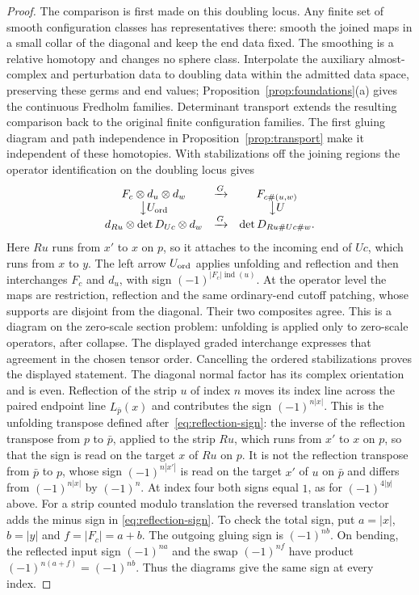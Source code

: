 \documentclass[11pt]{amsart}
\theoremstyle{definition}
\theoremstyle{remark}
\theoremstyle{plain}
\numberwithin{equation}{section}
\newcommand{\ind}{\operatorname{ind}}
\begin{document}
\begin{proof}
The comparison is first made on this doubling locus. Any finite
set of smooth configuration classes has representatives there:
smooth the joined maps in a small collar of the diagonal and keep
the end data fixed. The smoothing is a relative homotopy and
changes no sphere class. Interpolate the auxiliary almost-complex
and perturbation data to doubling data within the admitted data
space, preserving these germs and end values;
Proposition~\ref{prop:foundations}(a) gives the continuous
Fredholm families. Determinant transport extends the resulting
comparison back to the original finite configuration families.
The first gluing diagram and path independence in
Proposition~\ref{prop:transport} make it independent of these
homotopies. With stabilizations off the joining regions the
operator identification on the doubling locus gives
\[
\begin{array}{ccc}
 F_c\otimes d_u\otimes d_w&\xrightarrow{G}&F_{c\#(u,w)}\\
 \big\downarrow U_{\rm ord}&&\big\downarrow U\\
 d_{Ru}\otimes\det D_{Uc}\otimes d_w
 &\xrightarrow{G}&\det D_{Ru\#Uc\#w}.
\end{array}
\]
Here $Ru$ runs from $x'$ to $x$ on $p$, so it attaches to the
incoming end of $Uc$, which runs from $x$ to $y$. The left arrow
$U_{\rm ord}$ applies unfolding and reflection and then interchanges
$F_c$ and $d_u$, with sign $(-1)^{|F_c|\ind(u)}$. At the
operator level the maps are restriction, reflection and the same
ordinary-end cutoff patching, whose supports are disjoint from
the diagonal. Their two composites agree. This is a diagram on
the zero-scale section problem: unfolding is applied only to
zero-scale operators, after collapse. The
displayed graded interchange expresses that agreement in the
chosen tensor order. Cancelling the ordered
stabilizations proves the displayed statement. The diagonal
normal factor has its complex orientation and is even.
Reflection of the strip $u$ of index $n$ moves its index line
across the paired endpoint line $L_{\bar p}(x)$ and contributes the sign
$(-1)^{n|x|}$. This is the unfolding transpose defined
after~\eqref{eq:reflection-sign}: the inverse of the reflection transpose
from $p$ to $\bar p$, applied to the strip $Ru$, which runs from $x'$ to
$x$ on $p$, so that the sign is read on the target $x$ of $Ru$ on $p$. It
is not the reflection transpose from $\bar p$ to $p$, whose sign
$(-1)^{n|x'|}$ is read on the target $x'$ of $u$ on $\bar p$ and differs
from $(-1)^{n|x|}$ by $(-1)^n$. At index four both signs equal $1$, as
for $(-1)^{4|y|}$ above.
For a strip counted modulo translation the reversed translation
vector adds the minus sign in \eqref{eq:reflection-sign}.
To check the total sign, put $a=|x|$, $b=|y|$ and
$f=|F_c|=a+b$. The outgoing gluing sign is $(-1)^{nb}$.
On bending, the reflected input sign $(-1)^{na}$ and the swap
$(-1)^{nf}$ have product $(-1)^{n(a+f)}=(-1)^{nb}$.
Thus the diagrams give the same sign at every index.
\end{proof}
\end{document}
